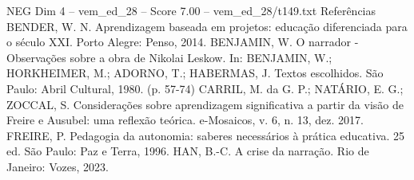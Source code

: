 \begin{textsample}{NEG Dim 4 – vem\_ed\_28 – Score 7.00 – vem\_ed\_28/t149.txt}
Referências BENDER, W.
N.
Aprendizagem baseada em projetos: educação diferenciada para o século XXI.
Porto Alegre: Penso, 2014.
BENJAMIN, W.
O narrador - Observações sobre a obra de Nikolai Leskow.
In: BENJAMIN, W.; HORKHEIMER, M.; ADORNO, T.; HABERMAS, J.
Textos escolhidos.
São Paulo: Abril Cultural, 1980. (p. 57-74) CARRIL, M. da G.
P.; NATÁRIO, E.
G.; ZOCCAL, S.
Considerações sobre aprendizagem significativa a partir da visão de Freire e Ausubel: uma reflexão teórica. e-Mosaicos, v. 6, n. 13, dez. 2017.
FREIRE, P.
Pedagogia da autonomia: saberes necessários à prática educativa. 25 ed.
São Paulo: Paz e Terra, 1996.
HAN, B.-C.
A crise da narração.
Rio de Janeiro: Vozes, 2023.

\end{textsample}
